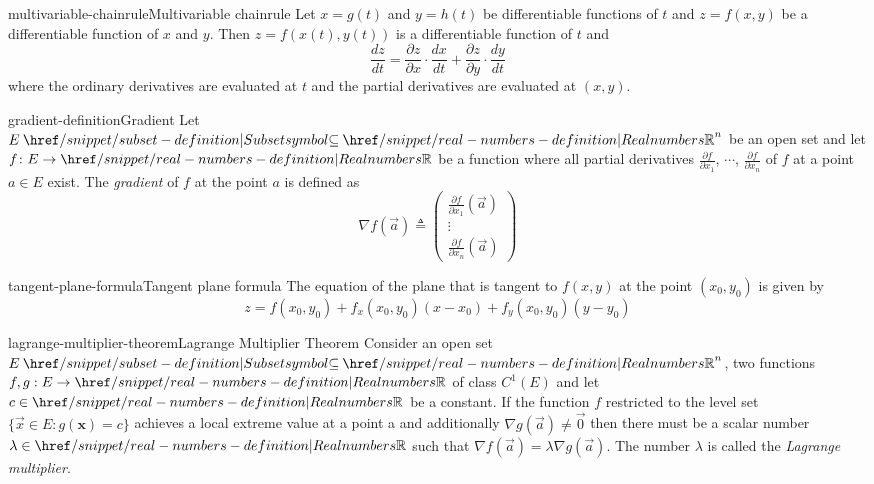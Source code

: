 \documentclass[preview]{standalone}
\begin{document}
\genpage

\begin{snippettheorem}{multivariable-chainrule}{Multivariable chainrule}
    Let \(x=g(t)\) and \(y=h(t)\) be differentiable functions of \(t\)
    and \(z=f(x,y)\) be a differentiable function of \(x\) and \(y\).
    Then \(z=f(x(t), y(t))\) is a differentiable function of \(t\) and
    \[
        \frac{dz}{dt} =
        \frac{\partial z}{\partial x} \cdot \frac{dx}{dt} +
        \frac{\partial z}{\partial y} \cdot \frac{dy}{dt}
    \]
    where the ordinary derivatives are evaluated at \(t\) and the partial
    derivatives are evaluated at \((x,y)\).
\end{snippettheorem}

\begin{snippetdefinition}{gradient-definition}{Gradient}
    Let \(E \subseteq {\realnumbers}^n\) be an open set and
    let \(f\colon E \to \realnumbers\) be a function where
    all partial derivatives \(\frac{\partial f}{\partial x_1}\),
    \(\cdots\), \(\frac{\partial f}{\partial x_n}\) of \(f\)
    at a point \(a\in E\) exist.
    The \textit{gradient} of \(f\) at the point \(a\)
    is defined as
    \[
        \nabla f(\vec{a}) \triangleq
        \left(\begin{array}{c}
        \frac{\partial f}{\partial x_1}(\vec{a}) \\
        \vdots \\
        \frac{\partial f}{\partial x_n}(\vec{a})
        \end{array}\right)
    \]
\end{snippetdefinition}

\begin{snippetproposition}{tangent-plane-formula}{Tangent plane formula}
    The equation of the plane that is tangent to \(f(x,y)\)
    at the point \((x_0, y_0)\) is given by
    \[
        z = f(x_0, y_0) + f_x(x_0, y_0)(x-x_0) + f_y(x_0, y_0)(y-y_0)
    \]
\end{snippetproposition}



\begin{snippettheorem}{lagrange-multiplier-theorem}{Lagrange Multiplier Theorem}
    Consider an open set $E \subseteq {\realnumbers}^n$, two functions $f, g: E \rightarrow \realnumbers$
    of class $C^1(E)$ and let $c \in \realnumbers$ be a constant.
    If the function $f$ restricted to the level set $\{\vec{x} \in E: g(\mathbf{x})=c\}$
    achieves a local extreme value at a point a and additionally
    $\nabla g(\vec{a}) \neq \vec{0}$ then there must be a scalar
    number $\lambda \in \realnumbers$ such that
    $\nabla f(\vec{a})=\lambda \nabla g(\vec{a})$. 
    The number $\lambda$ is called the \textit{Lagrange multiplier}.
\end{snippettheorem}


\end{document}
